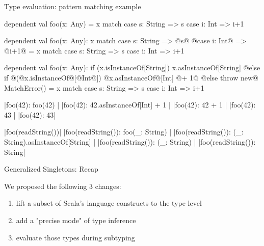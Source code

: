 \documentclass[10pt]{beamer}
\newenvironment{slide}[2][]
  {\begin{frame}[fragile,environment=slide,#1]{#2}}
  {\end{frame}}
\newcommand{\tp}[1]{\color{typeColor}#1}
\begin{document}
\begin{slide}{Type evaluation: pattern matching example}
\begin{overprint}
\begin{code}
dependent val foo(x: Any) =
  x match
    case s: String => s
    case i: Int => i+1
\end{code}
\begin{code}
dependent val foo(x: Any): {
  x match
    case s: String => @\tp{s}@
    @\tp{case i: Int}@ => @\tp{i+1}@
} =
  x match
    case s: String => s
    case i: Int => i+1
\end{code}
\begin{code}
dependent val foo(x: Any): {
  if (x.isInstanceOf[String]) x.asInstanceOf[String]
  @\tp{else if }@(@\tp{x.isInstanceOf}@[@\tp{Int}@]) @\tp{x.asInstanceOf}@[Int] @\tp{+ 1}@
  @\tp{else throw new}@ MatchError()
} =
  x match
    case s: String => s
    case i: Int => i+1
\end{code}
\end{overprint}
\bigskip

\begin{overprint}
|foo(42): { foo(42) }|
|foo(42): { 42.asInstanceOf[Int] + 1 }|
|foo(42): { 42 + 1 }|
|foo(42): { 43 }|
|foo(42): 43|
\end{overprint}

\begin{overprint}
|foo(readString())|
|foo(readString()): { foo(_: String) }|
|foo(readString()): { (_: String).asInstanceOf[String] }|
|foo(readString()): { (_: String) }|
|foo(readString()): String|
\end{overprint}
\end{slide}

\begin{slide}{Generalized Singletons: Recap}

We proposed the following 3 changes:
\begin{enumerate}
  \item lift a subset of Scala's language constructs to the type level
  \item add a "precise mode" of type inference
  \item evaluate those types during subtyping
\end{enumerate}
\end{slide}

\end{document}
